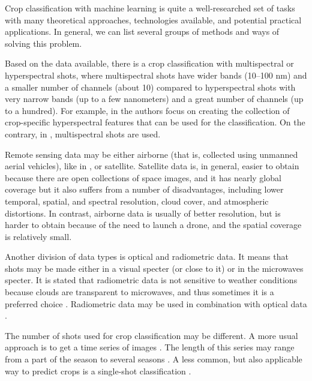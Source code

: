 \documentclass{article}
\begin{document}
Crop classification with machine learning is quite a well-researched set of tasks with many theoretical approaches, technologies available, and potential practical applications. In general, we can list several groups of methods and ways of solving this problem.

Based on the data available, there is a crop classification with multispectral or hyperspectral shots, where multispectral shots have wider bands (10–100 nm) and a smaller number of channels (about 10) compared to hyperspectral shots with very narrow bands (up to a few nanometers) and a great number of channels (up to a hundred). For example, in \cite{agronomy9090496} the authors focus on creating the collection of crop-specific hyperspectral features that can be used for the classification. On the contrary, in \cite{7891032}, multispectral shots are used.

Remote sensing data may be either airborne (that is, collected using unmanned aerial vehicles), like in \cite{app9040643}, or satellite. Satellite data is, in general, easier to obtain because there are open collections of space images, and it has nearly global coverage but it also suffers from a number of disadvantages, including lower temporal, spatial, and spectral resolution, cloud cover, and atmospheric distortions. In contrast, airborne data is usually of better resolution, but is harder to obtain because of the need to launch a drone, and the spatial coverage is relatively small.

Another division of data types is optical and radiometric data. It means that shots may be made either in a visual specter (or close to it) or in the microwaves specter. It is stated that radiometric data is not sensitive to weather conditions because clouds are transparent to microwaves, and thus sometimes it is a preferred choice \cite{DANDRIMONT2021112708}. Radiometric data may be used in combination with optical data \cite{Moumni2021}.

The number of shots used for crop classification may be different. A more usual approach is to get a time series of images \cite{7891032, DANDRIMONT2021112708, Moumni2021, ZHONG2019430}. The length of this series may range from a part of the season \cite{rußwurm2022endtoend} to several seasons \cite{quinton2021crop}. A less common, but also applicable way to predict crops is a single-shot classification \cite{MENG2021106188}.
\end{document}
